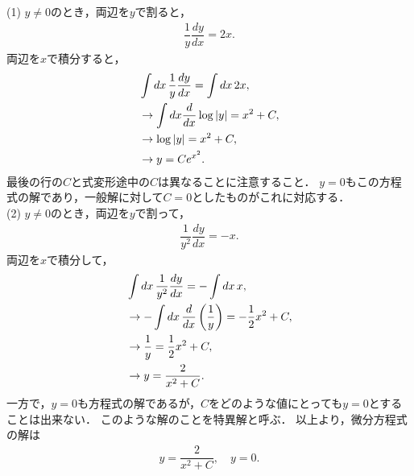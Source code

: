 \noindent
(1) $y\neq 0$のとき，両辺を$y$で割ると，
\begin{align}
  \dfrac{1}{y}\dfrac{dy}{dx} = 2x. 
\end{align} 
両辺を$x$で積分すると，
\begin{align}
  & \int dx\, \dfrac{1}{y}\dfrac{dy}{dx} = \int dx\,2x, \notag \\
  & \rightarrow \int dx \dfrac{d}{dx} \log \left|y\right| = x^2 + C, \notag \\
  & \rightarrow \log \left|y\right| = x^2 + C, \notag \\
  & \rightarrow y = Ce^{x^2}. 
\end{align}
最後の行の$C$と式変形途中の$C$は異なることに注意すること．
$y=0$もこの方程式の解であり，一般解に対して$C=0$としたものがこれに対応する．\\
(2) $y\neq 0$のとき，両辺を$y$で割って，
\begin{align}
  \dfrac{1}{y^2}\dfrac{dy}{dx} = - x. 
\end{align}
両辺を$x$で積分して，
\begin{align}
  & \int dx\, \dfrac{1}{y^2}\dfrac{dy}{dx} = -\int dx\,x, \notag \\
  & \rightarrow -\int dx\, \dfrac{d}{dx}\left(\dfrac{1}{y}\right) = -\dfrac{1}{2}x^2 + C, \notag \\
  & \rightarrow \dfrac{1}{y} = \dfrac{1}{2} x^2 +C, \notag \\
  & \rightarrow y = \dfrac{2}{x^2 + C}. 
\end{align}
一方で，$y=0$も方程式の解であるが，$C$をどのような値にとっても$y=0$とすることは出来ない．
このような解のことを特異解と呼ぶ．
以上より，微分方程式の解は
\begin{align}
  y = \dfrac{2}{x^2 + C}, \quad y = 0. 
\end{align}

